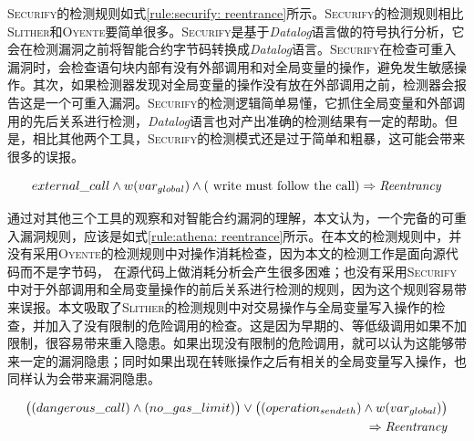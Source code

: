 \textsc{Securify}的检测规则如式\ref{rule:securify: reentrance}所示。\textsc{Securify}的检测规则相比\textsc{Slither}和\textsc{Oyente}要简单很多。\textsc{Securify}是基于\emph{Datalog}语言做的符号执行分析，它会在检测漏洞之前将智能合约字节码转换成\emph{Datalog}语言。\textsc{Securify}在检查可重入漏洞时，会检查语句块内部有没有外部调用和对全局变量的操作，避免发生敏感操作。其次，如果检测器发现对全局变量的操作没有放在外部调用之前，检测器会报告这是一个可重入漏洞。\textsc{Securify}的检测逻辑简单易懂，它抓住全局变量和外部调用的先后关系进行检测，\emph{Datalog}语言也对产出准确的检测结果有一定的帮助。但是，相比其他两个工具，\textsc{Securify}的检测模式还是过于简单和粗暴，这可能会带来很多的误报。
\begin{mdframed}[
	linewidth = 1pt,
	innertopmargin = -5pt,
	innerbottommargin = 3pt,
	outerlinewidth = 1pt
	]
    \small
	\begin{equation} \label{rule:securify: reentrance}
    external\_call \wedge w(var_{global}) \wedge (\text{ write must follow the call})  \Rightarrow \text{\emph{Reentrancy}}
	\end{equation}
\end{mdframed}
通过对其他三个工具的观察和对智能合约漏洞的理解，本文认为，一个完备的可重入漏洞规则，应该是如式\ref{rule:athena: reentrance}所示。在本文的检测规则中，并没有采用\textsc{Oyente}的检测规则中对操作消耗检查，因为本文的检测工作是面向源代码而不是字节码， 在源代码上做消耗分析会产生很多困难；也没有采用\textsc{Securify}中对于外部调用和全局变量操作的前后关系进行检测的规则，因为这个规则容易带来误报。本文吸取了\textsc{Slither}的检测规则中对交易操作与全局变量写入操作的检查，并加入了没有限制的危险调用的检查。这是因为早期的、等低级调用如果不加限制，很容易带来重入隐患。如果出现没有限制的危险调用，就可以认为这能够带来一定的漏洞隐患；同时如果出现在转账操作之后有相关的全局变量写入操作，也同样认为会带来漏洞隐患。
\begin{mdframed}[
	linewidth = 1pt,
	innertopmargin = -10pt,
	innerbottommargin = 3pt,
	outerlinewidth = 1pt
	]
    \small
	\begin{equation} \label{rule:athena: reentrance}
    \begin{split}
       \big ((dangerous\_call) \wedge (no\_gas\_limit)\big ) \vee \big ((operation_{sendeth}) \wedge w(var_{global})\big ) \\
       \Rightarrow \text{\emph{Reentrancy}}
    \end{split}
	\end{equation}
\end{mdframed}

